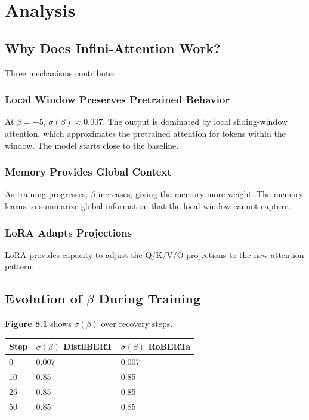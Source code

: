 
\section{Analysis}

\subsection{Why Does Infini-Attention Work?}

Three mechanisms contribute:

\subsubsection{Local Window Preserves Pretrained Behavior}

At $\beta = -5$, $\sigma(\beta) \approx 0.007$. The output is dominated 
by local sliding-window attention, which approximates the pretrained 
attention for tokens within the window. The model starts close to the 
baseline.

\subsubsection{Memory Provides Global Context}

As training progresses, $\beta$ increases, giving the memory more weight. 
The memory learns to summarize global information that the local window 
cannot capture.

\subsubsection{LoRA Adapts Projections}

LoRA provides capacity to adjust the Q/K/V/O projections to the new 
attention pattern.

\subsection{Evolution of $\beta$ During Training}

\textbf{Figure 8.1} shows $\sigma(\beta)$ over recovery steps.

\begin{table}[H]
\centering
\small
\begin{tabular}{lll}
\toprule
\textbf{Step} & \textbf{$\sigma(\beta)$ DistilBERT} & \textbf{$\sigma(\beta)$ RoBERTa} \\
\midrule
0 & 0.007 & 0.007 \\
10 & 0.85 & 0.85 \\
25 & 0.85 & 0.85 \\
50 & 0.85 & 0.85 \\
\bottomrule
\end{tabular}
\end{table}

